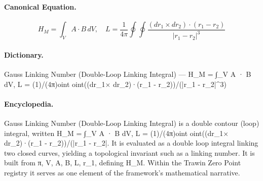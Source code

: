 \paragraph{Canonical Equation.}
\[
H_M = \int_V A \cdot B \, dV,\quad L = \frac{1}{4\pi}\oint\!\oint\frac{(dr_1\times dr_2)\cdot(r_1 - r_2)}{|r_1 - r_2|^3}
\]

\paragraph{Dictionary.}
Gauss Linking Number (Double-Loop Linking Integral) — H\_M = ∫\_V A · B dV, L = (1)/(4π)oint oint((dr\_1× dr\_2)·(r\_1 - r\_2))/(|r\_1 - r\_2|\textasciicircum{}3)

\paragraph{Encyclopedia.}
Gauss Linking Number (Double-Loop Linking Integral) is a double contour (loop) integral, written H\_M = ∫\_V A · B dV, L = (1)/(4π)oint oint((dr\_1× dr\_2)·(r\_1 - r\_2))/(|r\_1 - r\_2|. It is evaluated as a double loop integral linking two closed curves, yielding a topological invariant such as a linking number. It is built from π, V, A, B, L, r\_1, defining H\_M. Within the Trawin Zero Point registry it serves as one element of the framework's mathematical narrative.
